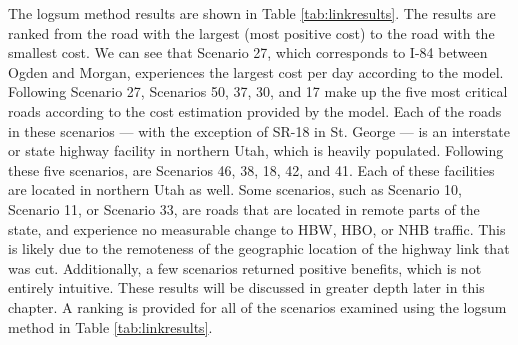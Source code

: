 The logsum method results are shown in Table \ref{tab:linkresults}.
The results are ranked from the road with the largest (most positive
cost) to the road with the smallest cost. We can see that Scenario 27, which
corresponds to I-84 between Ogden and Morgan, experiences the largest cost
per day according to the model. Following Scenario 27, Scenarios 50, 37, 30,
and 17 make up the five most critical roads according to the cost estimation
provided by the model. Each of the roads in these scenarios --- with the exception
of SR-18 in St. George --- is an interstate or state highway facility in
northern Utah, which is heavily populated. Following these five scenarios, are
Scenarios 46, 38, 18, 42, and 41. Each of these facilities are located in northern Utah as well.
Some scenarios, such as Scenario 10,
Scenario 11, or Scenario 33, are roads that are located in remote parts of the state, and
experience no measurable change to HBW, HBO, or NHB traffic. This is
likely due to the remoteness of the geographic location of the highway
link that was cut. Additionally, a few scenarios returned positive benefits, which is not entirely intuitive. These results will be discussed in greater depth later in this chapter. A ranking is provided for all of the scenarios examined
using the logsum method in Table \ref{tab:linkresults}.

